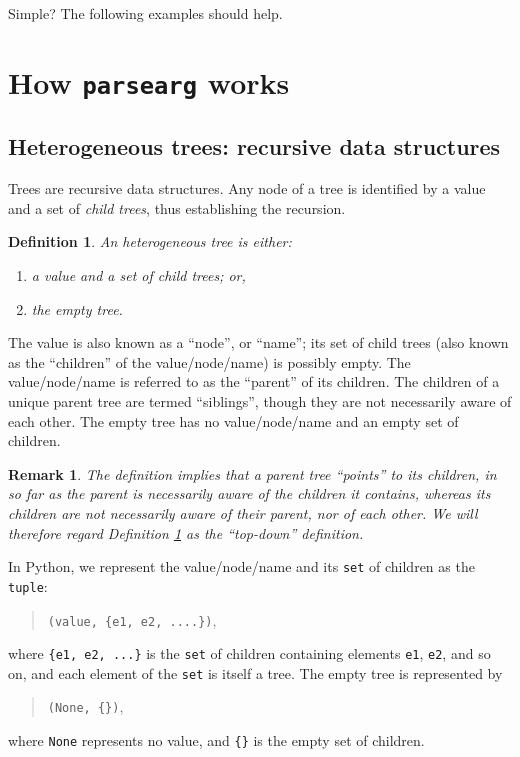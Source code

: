 \documentclass[10pt]{amsart}
\numberwithin{equation}{section}
\newtheorem{defn}{Definition}[section]
\newtheorem{remark}{Remark}[section]
\begin{document}
Simple? The following examples should help.

\newpage
\section{How \texttt{parsearg} works}
\label{sec:org4331aa0}
\subsection{Heterogeneous trees: recursive data structures}
\label{sec:org054b1c9}
Trees are recursive data structures.  Any node of a tree is identified by
a value and a set of \emph{child trees}, thus establishing the recursion.

\begin{defn}
\label{defn:1}
An heterogeneous tree is either:
    \begin{enumerate}
        \item a value and a set of child trees; or,
        \item the empty tree.
    \end{enumerate}
\end{defn}

The value is also known as a ``node'', or ``name''; its set of child trees 
(also known as the ``children'' of the value/node/name) is possibly empty.
The value/node/name is referred to as the ``parent'' of its children.
The children of a unique parent tree are termed ``siblings'', though
they are not necessarily aware of each other.
The empty tree has no value/node/name and an empty set of children.

\begin{remark}
The definition implies that a parent tree ``points'' to its children, in so far
as the parent is necessarily aware of the children it contains, whereas its
children are not necessarily aware of their parent, nor of each other.  
We will therefore regard Definition \ref{defn:1} as the ``top-down'' definition.
\end{remark}

In Python, we represent the value/node/name and its \texttt{set} of children as the 
\texttt{tuple}: 
\begin{quote}
\texttt{(value, \{e1, e2, ....\})},
\end{quote}
where \texttt{\{e1, e2, ...\}} is the \texttt{set} of children containing elements 
\texttt{e1}, \texttt{e2}, and so on, and each element of the \texttt{set} is itself a tree.  
The empty tree is represented by
\begin{quote}
\texttt{(None, \{\})},
\end{quote}
where \texttt{None} represents no value, and \texttt{\{\}} is the empty set of children.
\end{document}
